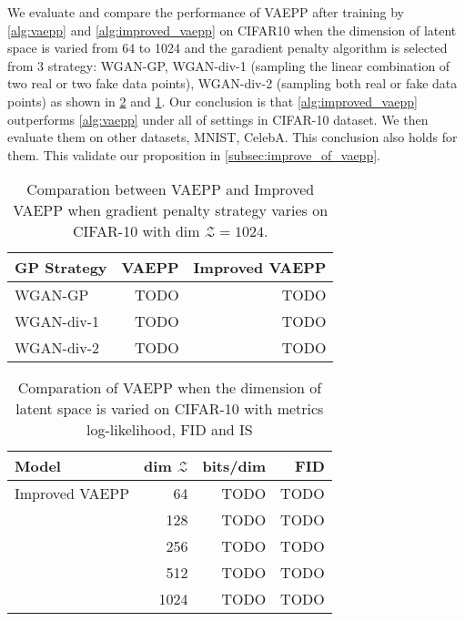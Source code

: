 We evaluate and compare the performance of VAEPP after training by \cref{alg:vaepp} and \cref{alg:improved_vaepp} on CIFAR10 when the dimension of latent space is varied from 64 to 1024 and the garadient penalty algorithm is selected from 3 strategy: WGAN-GP, WGAN-div-1  (sampling the linear combination of two real or two fake data points), WGAN-div-2 (sampling both real or fake data points) as shown in \cref{tab:compare_nD_over_z_dim} and \cref{tab:compare_nD_over_R}. Our conclusion is that \cref{alg:improved_vaepp} outperforms \cref{alg:vaepp} under all of settings in CIFAR-10 dataset. We then evaluate them on other datasets, MNIST, CelebA. This conclusion also holds for them. This validate our proposition in \cref{subsec:improve_of_vaepp}. 
\begin{table}[tb]
\centering
\begin{tabular}{lrr}  
\toprule
GP Strategy  &  VAEPP  &  Improved VAEPP \\
\midrule
WGAN-GP            &  TODO   & TODO      \\
WGAN-div-1         &  TODO   & TODO      \\
WGAN-div-2         &  TODO   & TODO      \\
\bottomrule
\end{tabular}
\caption{Comparation between VAEPP and Improved VAEPP when gradient penalty strategy varies on CIFAR-10 with dim $\mathcal{Z} = 1024$. }
\label{tab:compare_nD_over_R}
\end{table}
\begin{table}[tb]
\centering
\begin{tabular}{lrrr}  
\toprule
Model  &  dim $\mathcal{Z}$  &  bits/dim  & FID \\
\midrule
Improved VAEPP   &  64   & TODO  & TODO     \\
                 &  128  & TODO  & TODO     \\
                 &  256  & TODO  & TODO     \\
                 &  512  & TODO  & TODO     \\
                 &  1024 & TODO  & TODO     \\
\bottomrule
\end{tabular}
\caption{Comparation of VAEPP when the dimension of latent space is varied on CIFAR-10 with metrics log-likelihood, FID and IS}
\label{tab:compare_nD_over_z_dim}
\end{table}
